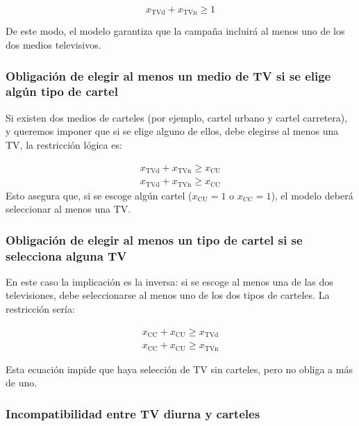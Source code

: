 \begin{equation}
x_{\text{TVd}} + x_{\text{TVn}} \geq 1
\end{equation}

\noindent
De este modo, el modelo garantiza que la campaña incluirá al menos uno de los dos medios televisivos.

\subsubsection{Obligación de elegir al menos un medio de TV si se elige algún tipo de cartel}

Si existen dos medios de carteles (por ejemplo, cartel urbano y cartel carretera), y queremos imponer que si se elige alguno de ellos, debe elegirse al menos una TV, la restricción lógica es:

\begin{align}   
x_{\text{TVd}} + x_{\text{TVn}} \geq x_{\text{CU}} \\
x_{\text{TVd}} + x_{\text{TVn}} \geq x_{\text{CC}}
\end{align}
\noindent
Esto asegura que, si se escoge algún cartel ($x_{\text{CU}}=1$ o $x_{\text{CC}}=1$), el modelo deberá seleccionar al menos una TV.

\subsubsection{Obligación de elegir al menos un tipo de cartel si se selecciona alguna TV}

En este caso la implicación es la inversa: si se escoge al menos una de las dos televisiones, debe seleccionarse al menos uno de los dos tipos de carteles.  
La restricción sería:



\begin{align}   
x_{\text{CC}} + x_{\text{CU}} \geq x_{\text{TVd}} \\
x_{\text{CC}} + x_{\text{CU}} \geq x_{\text{TVn}}
\end{align}

\noindent
Esta ecuación impide que haya selección de TV sin carteles, pero no obliga a más de uno.

\subsubsection{Incompatibilidad entre TV diurna y carteles}


